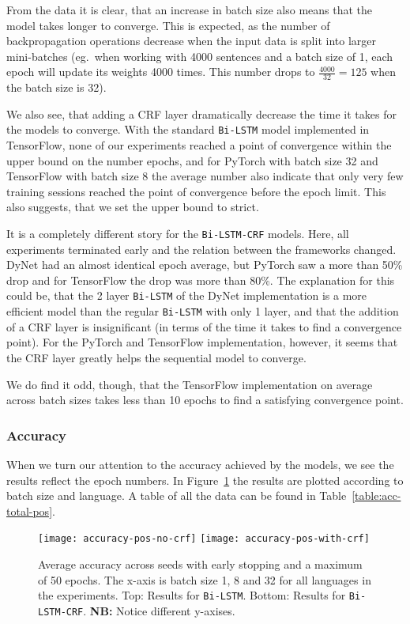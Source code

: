 From the data it is clear, that an increase in batch size also means that the
model takes longer to converge. This is expected, as the number of
backpropagation operations decrease when the input data is split into larger
mini-batches (eg.\ when working with 4000 sentences and a batch size of 1, each
epoch will update its weights 4000 times. This number drops to
$\frac{4000}{32}=125$ when the batch size is 32).

We also see, that adding a CRF layer dramatically decrease the time it takes for
the models to converge. With the standard \texttt{Bi-LSTM} model implemented in
TensorFlow, none of our experiments reached a point of convergence within the
upper bound on the number epochs, and for PyTorch with batch size 32 and
TensorFlow with batch size 8 the average number also indicate that only very few
training sessions reached the point of convergence before the epoch limit. This
also suggests, that we set the upper bound to strict.

It is a completely different story for the \texttt{Bi-LSTM-CRF} models. Here,
all experiments terminated early and the relation between the frameworks
changed.  DyNet had an almost identical epoch average, but PyTorch saw a more
than 50\% drop and for TensorFlow the drop was more than 80\%. The explanation
for this could be, that the 2 layer \texttt{Bi-LSTM} of the DyNet implementation
is a more efficient model than the regular \texttt{Bi-LSTM} with only 1 layer,
and that the addition of a CRF layer is insignificant (in terms of the time it
takes to find a convergence point). For the PyTorch and TensorFlow
implementation, however, it seems that the CRF layer greatly helps the
sequential model to converge.

We do find it odd, though, that the TensorFlow implementation on average across
batch sizes takes less than 10 epochs to find a satisfying convergence point.

\subsubsection{Accuracy}

When we turn our attention to the accuracy achieved by the models, we see the
results reflect the epoch numbers. In
Figure~\ref{chart:acc-by-batch-and-lang-pos} the results are plotted
according to batch size and language. A table of all the data can be found in
Table~\ref{table:acc-total-pos}.

\begin{figure}[h!]
    \texttt{[image: accuracy-pos-no-crf]}
    \texttt{[image: accuracy-pos-with-crf]}
    \caption{Average accuracy across seeds with early stopping and a maximum of
        50 epochs. The x-axis is batch size 1, 8 and 32 for all languages in the
        experiments. Top: Results for \texttt{Bi-LSTM}. Bottom: Results for
    \texttt{Bi-LSTM-CRF}. \textbf{NB:} Notice different y-axises.
    }\label{chart:acc-by-batch-and-lang-pos}
\end{figure}

